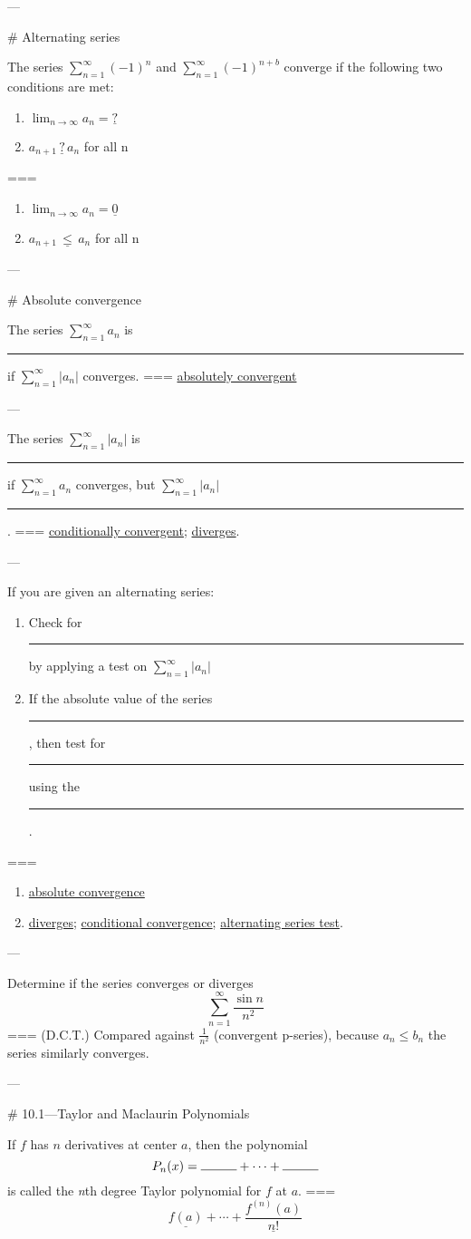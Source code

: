 ---

# Alternating series

The series \(\sum_{n=1}^\infty {(-1)}^{n}\) and \(\sum_{n=1}^\infty
{(-1)}^{n+b}\) converge if the following two conditions are met:
\begin{enumerate}
  \item \(\lim_{n\to\infty} a_n=\underline{?}\)
  \item \(a_{n+1}\,\underline{?}\,a_n\) for all n
\end{enumerate}
===
\begin{enumerate}
  \item \(\lim_{n\to\infty} a_n=\underline{0}\)
  \item \(a_{n+1}\,\underline{\leq}\,a_n\) for all n
\end{enumerate}

---

# Absolute convergence

The series \(\sum_{n=1}^\infty a_n\) is \rule{1cm}{0.15mm} if
\(\sum_{n=1}^\infty |a_n|\) converges.
===
\underline{absolutely convergent}

---

The series \(\sum_{n=1}^\infty |a_n|\) is \rule{1cm}{0.15mm} if
\(\sum_{n=1}^\infty a_n\) converges, but \(\sum_{n=1}^\infty |a_n|\)
\rule{1cm}{0.15mm}.
===
\underline{conditionally convergent}; \underline{diverges}.

---

If you are given an alternating series:
\begin{enumerate}
  \item Check for \rule{1cm}{0.15mm} by applying a test on \(\sum_{n=1}^\infty
    |a_n|\)
  \item If the absolute value of the series \rule{1cm}{0.15mm}, then test for
    \rule{1cm}{0.15mm} using the \rule{1cm}{0.15mm}.
\end{enumerate}
===
\begin{enumerate}
  \item \underline{absolute convergence}
  \item \underline{diverges}; \underline{conditional convergence};
    \underline{alternating series test}.
\end{enumerate}

---

Determine if the series converges or diverges
\[\sum_{n=1}^\infty \frac{\sin n}{n^2}\]
===
(D.C.T.) Compared against \(\frac{1}{n^2}\) (convergent p-series), because
\(a_n\leq b_n\) the series similarly converges.

---

# 10.1---Taylor and Maclaurin Polynomials

If \(f\) has \(n\) derivatives at center \(a\), then the polynomial
\[P_n(x)=\rule{1cm}{0.15mm}+\cdots+\rule{1cm}{0.15mm}\]
is called the \textit{n}th degree Taylor polynomial for \(f\) at \(a\).
===
\[\underline{f(a)}+\cdots+\underline{\frac{f^{(n)}(a)}{n!}}\]
